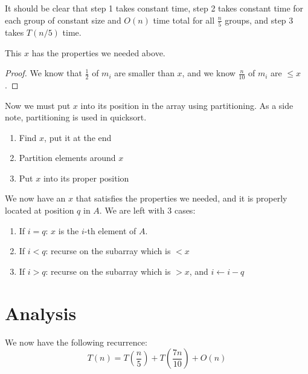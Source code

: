 It should be clear that step 1 takes constant time, step 2 takes
constant time for each group of constant size and $O(n)$ time total
for all $\frac{n}{5}$ groups, and step 3 takes $T(n/5)$ time.

\begin{claim}
This $x$ has the properties we needed above.
\end{claim}

\begin{proof}
We know that $\frac{1}{2}$ of $m_i$ are smaller than $x$, and we know $\frac{n}{10}$ of $m_i$ are $ \leq x $.
\end{proof}

Now we must put $x$ into its position in the array using partitioning.
As a side note, partitioning is used in quicksort.

\begin{enumerate}

\item Find $x$, put it at the end
\item Partition elements around $x$
\item Put $x$ into its proper position

\end{enumerate}

We now have an $x$ that satisfies the properties we needed, and it is
properly located at position $q$ in $A$.  We are left with 3 cases:

\begin{enumerate}

\item If $i = q$: $x$ is the $i$-th element of $A$.
\item If $i < q$: recurse on the subarray which is $ < x $

\item If $i > q$: recurse on the subarray which is $ > x $, and $ i
  \leftarrow i - q $

\end{enumerate}

\section{Analysis}

We now have the following recurrence:
%
\begin{displaymath}
T(n) = T \left( \frac{n}{5} \right) +T \left( \frac{7n}{10} \right) + O(n)
\end{displaymath}



